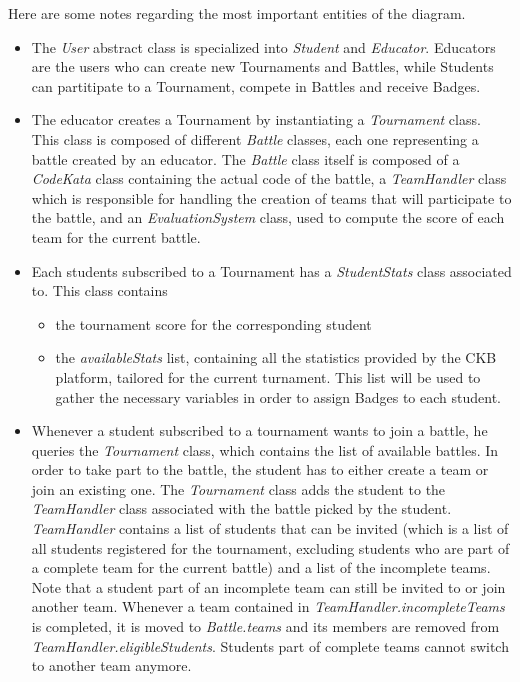 \documentclass[a4paper, 11pt, titlepage]{article}
\begin{document}
Here are some notes regarding the most important entities of the diagram.
\begin{itemize}

    \item The \emph{User} abstract class is specialized into \emph{Student} and \emph{Educator}. Educators are the users who can create new Tournaments and Battles, while Students can partitipate to a Tournament, compete in Battles and receive Badges.
    
    \item The educator creates a Tournament by instantiating a \emph{Tournament} class. This class is composed of different \emph{Battle} classes, each one representing a battle created by an educator. The \emph{Battle} class itself is composed of a \emph{CodeKata} class containing the actual code of the battle, a \emph{TeamHandler} class which is responsible for handling the creation of teams that will participate to the battle, and an \emph{EvaluationSystem} class, used to compute the score of each team for the current battle. 
    
    \item Each students subscribed to a Tournament has a \emph{StudentStats} class associated to. This class contains 
    \begin{itemize} 
        \item the tournament score for the corresponding student
        \item the \emph{availableStats} list, containing all the statistics provided by the CKB platform, tailored for the current turnament. This list will be used to gather the necessary variables in order to assign Badges to each student.
    \end{itemize}

    \item Whenever a student subscribed to a tournament wants to join a battle, he queries the \emph{Tournament} class, which contains the list of available battles. In order to take part to the battle, the student has to either create a team or join an existing one. The \emph{Tournament} class adds the student to the \emph{TeamHandler} class associated with the battle picked by the student. \emph{TeamHandler} contains a list of students that can be invited (which is a list of all students registered for the tournament, excluding students who are part of a complete team for the current battle) and a list of the incomplete teams. Note that a student part of an incomplete team can still be invited to or join another team. Whenever a team contained in \emph{TeamHandler.incompleteTeams} is completed, it is moved to \emph{Battle.teams} and its members are removed from \emph{TeamHandler.eligibleStudents}. Students part of complete teams cannot switch to another team anymore.
    

\end{itemize}
\end{document}
